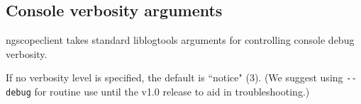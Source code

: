 \subsection{Console verbosity arguments}

ngscopeclient takes standard liblogtools arguments for controlling console debug verbosity.

If no verbosity level is specified, the default is ``notice" (3). (We suggest using \texttt{-{}-debug} for routine use
until the v1.0 release to aid in troubleshooting.)

